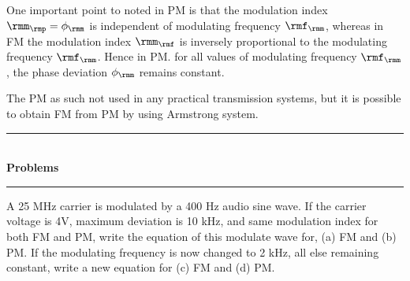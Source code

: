 One important point to noted in PM is that the modulation index $\rmm_\rmp =
\phi_\rmm$ is independent of modulating frequency $\rmf_\rmm$, whereas in FM
the modulation index $\rmm_\rmf$ is inversely proportional to the
modulating frequency $\rmf_\rmm$. Hence in PM. for all values of modulating
frequency $\rmf_\rmm$, the phase deviation $\phi_\rmm$ remains constant.

The PM as such not used in any practical transmission systems, but it
is possible to obtain FM from PM by using Armstrong system.

\begin{center}
\rule{4cm}{1pt}\\
{\bf\Large Problems}\\[-3pt]
\rule{4cm}{1pt}
\end{center}

\begin{problem}\label{prob8.25}
A 25 MHz carrier is modulated by a 400 Hz audio sine wave. If the
carrier voltage is 4V, maximum deviation is 10 kHz, and same
modulation index for both FM and PM, write the equation of this
modulate wave for,
(a) FM and (b) PM. If the modulating frequency is now changed to 2
kHz, all else remaining constant, write a new equation for (c) FM and
(d) PM.
\end{problem}

